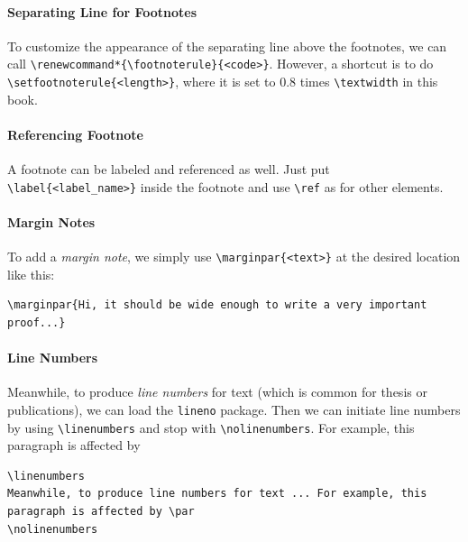 \paragraph{Separating Line for Footnotes} 
To customize the appearance of the separating line above the footnotes, we can call \texttt{\textbackslash renewcommand*\{\textbackslash footnoterule\}\allowbreak\{<code>\}}. However, a shortcut is to do \texttt{\textbackslash setfootnoterule\{<length>\}}, where it is set to $0.8$ times \texttt{\textbackslash textwidth} in this book.

\paragraph{Referencing Footnote}
A footnote can be labeled and referenced as well. Just put \texttt{\textbackslash label\{<label\_name>\}} inside the footnote and use \texttt{\textbackslash ref} as for other elements.

\paragraph{Margin Notes}
To add a \textit{margin note}, we simply use \texttt{\textbackslash marginpar\{<text>\}} at the desired location like this:
\begin{lstlisting}
\marginpar{Hi, it should be wide enough to write a very important proof...}
\end{lstlisting}

\paragraph{Line Numbers}
\linenumbers
Meanwhile, to produce \textit{line numbers} for text (which is common for thesis or publications), we can load the \texttt{lineno} package. Then we can initiate line numbers by using \texttt{\textbackslash linenumbers} and stop with \texttt{\textbackslash nolinenumbers}. For example, this paragraph is affected by \par
\nolinenumbers
\begin{lstlisting}
\linenumbers
Meanwhile, to produce line numbers for text ... For example, this paragraph is affected by \par
\nolinenumbers 
\end{lstlisting}

